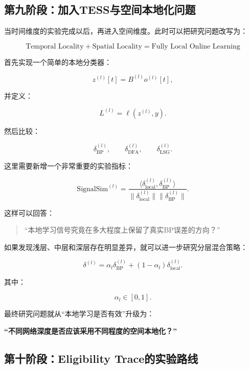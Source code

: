\documentclass[journal,12pt,onecolumn]{IEEEtran}
\begin{document}

\subsection{第九阶段：加入TESS与空间本地化问题}

当时间维度的实验完成以后，再进入空间维度。此时可以把研究问题改写为：

\[
\boxed{
\text{Temporal Locality}
+
\text{Spatial Locality}
=
\text{Fully Local Online Learning}
}
\]

首先实现一个简单的本地分类器：

\[
z^{(l)}[t]
=
B^{(l)}o^{(l)}[t],
\]

并定义：

\[
L^{(l)}
=
\ell(z^{(l)},y).
\]

然后比较：

\[
\delta_{\mathrm{BP}}^{(l)},
\qquad
\delta_{\mathrm{DFA}}^{(l)},
\qquad
\delta_{\mathrm{LSG}}^{(l)}.
\]

这里需要新增一个非常重要的实验指标：

\[
\mathrm{SignalSim}^{(l)}
=
\frac{
\langle
\delta_{\mathrm{local}}^{(l)},
\delta_{\mathrm{BP}}^{(l)}
\rangle
}{
\|
\delta_{\mathrm{local}}^{(l)}
\|
\|
\delta_{\mathrm{BP}}^{(l)}
\|
}.
\]

这样可以回答：

\begin{quote}
“本地学习信号究竟在多大程度上保留了真实BP误差的方向？”
\end{quote}

如果发现浅层、中层和深层存在明显差异，就可以进一步研究分层混合策略：

\[
\delta^{(l)}
=
\alpha_l\delta_{\mathrm{BP}}^{(l)}
+
(1-\alpha_l)\delta_{\mathrm{local}}^{(l)}.
\]

其中：

\[
\alpha_l\in[0,1].
\]

最终研究问题就从“本地学习是否有效”升级为：

\begin{center}
\textbf{“不同网络深度是否应该采用不同程度的空间本地化？”}
\end{center}


\subsection{第十阶段：Eligibility Trace的实验路线}
\end{document}
